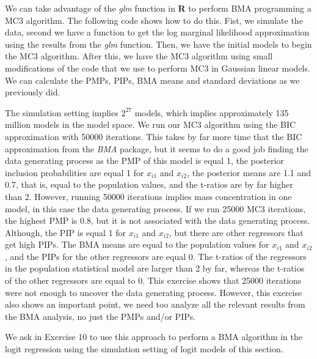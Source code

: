 We can take advantage of the \textit{glm} function in \textbf{R} to perform BMA programming a MC3 algorithm. The following code shows how to do this. Fist, we simulate the data, second we have a function to get the log marginal likelihood approximation using the results from the  \textit{glm} function. Then, we have the initial models to begin the MC3 algorithm. After this, we have the MC3 algorithm using small modifications of the code that we use to perform MC3 in Gaussian linear models. We can calculate the PMPs, PIPs, BMA means and standard deviations as we previously did.

The simulation setting implies $2^{27}$ models, which implies approximately 135 million models in the model space. We run our MC3 algorithm using the BIC approximation with 50000 iterations. This takes by far more time that the BIC approximation from the \textit{BMA} package, but it seems to do a good job finding the data generating process as the PMP of this model is equal 1, the posterior inclusion probabilities are equal 1 for $x_{i1}$ and $x_{i2}$, the posterior means are 1.1 and 0.7, that is, equal to the population values, and the t-ratios are by far higher than 2. However, running 50000 iterations implies mass concentration in one model, in this case the data generating process. If we run 25000 MC3 iterations, the highest PMP is 0.8, but it is not associated with the data generating process. Although, the PIP is equal 1 for $x_{i1}$ and $x_{i2}$, but there are other regressors that get high PIPs. The BMA means are equal to the population values for $x_{i1}$ and $x_{i2}$, and the PIPs for the other regressors are equal 0. The t-ratios of the regressors in the population statistical model are larger than 2 by far, whereas the t-ratios of the other regressors are equal to 0. This exercise shows that 25000 iterations were not enough to uncover the data generating process. However, this exercise also shows an important point, we need too analyze all the relevant results from the BMA analysis, no just the PMPs and/or PIPs.

We ask in Exercise 10 to use this approach to perform a BMA algorithm in the logit regression using the simulation setting of logit models of this section.    

